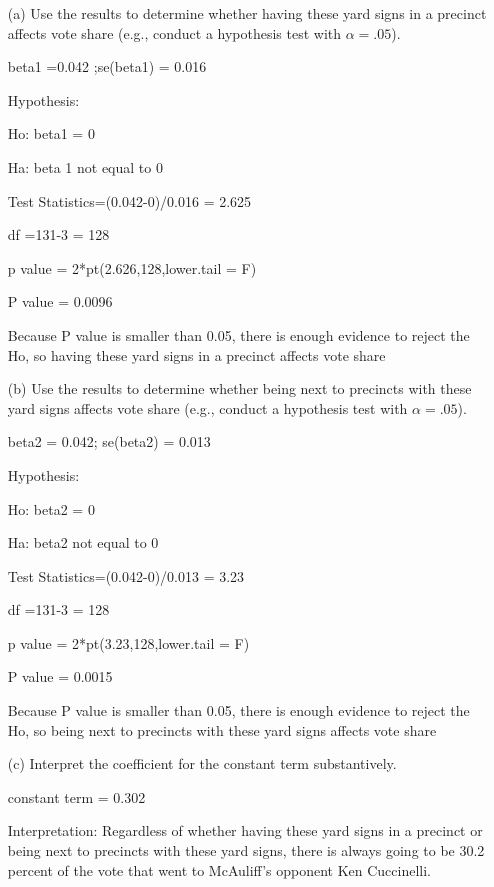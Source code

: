 \documentclass[12pt,letterpaper]{article}
\begin{document}
\vspace{.5cm}
\begin{enumerate}
	\item [(a)] Use the results to determine whether having these yard signs in a precinct affects vote share (e.g., conduct a hypothesis test with $\alpha = .05$).
	
	beta1 =0.042 ;se(beta1) = 0.016
	
	Hypothesis:
	
	Ho: beta1 = 0
	
	Ha: beta 1 not equal to 0
	
	Test Statistics=(0.042-0)/0.016 = 2.625 
	
	df =131-3 = 128
	
	p value = 2*pt(2.626,128,lower.tail = F)
	
	P value = 0.0096
	
	Because P value is smaller than 0.05, there is enough evidence to reject the Ho, so having these yard signs in a precinct affects vote share
	
	\newpage		
	\item [(b)]  Use the results to determine whether being
	next to precincts with these yard signs affects vote
	share (e.g., conduct a hypothesis test with $\alpha = .05$).
	
	beta2 = 0.042;  se(beta2) = 0.013
	
	Hypothesis:
	
	Ho: beta2 = 0
	
	Ha: beta2  not equal to 0
	
	Test Statistics=(0.042-0)/0.013 = 3.23 
	
	df =131-3 = 128
	
	p value = 2*pt(3.23,128,lower.tail = F)
	
	P value = 0.0015
	
	Because P value is smaller than 0.05, there is enough evidence to reject the Ho, so being next to precincts with these yard signs affects vote share
	
	
	\vspace{2cm}
	\item [(c)] Interpret the coefficient for the constant term substantively.
	
	constant term = 0.302
	
	Interpretation: Regardless of whether having these yard signs in a precinct or being next to precincts with these yard signs, there is always going to be 30.2 percent  of the vote that went to McAuliff’s opponent Ken Cuccinelli.
	

\end{enumerate}
\end{document}

